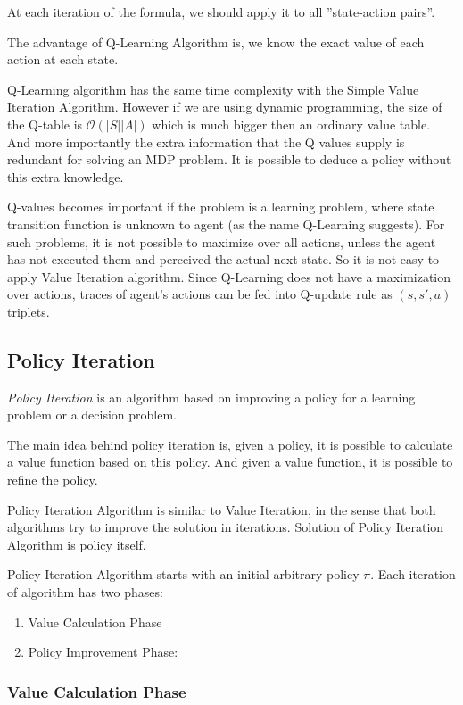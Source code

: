 At each iteration of the formula, we should apply it to all ''state-action pairs''.

The advantage of Q-Learning Algorithm is, we know the exact value of each action at each state.

Q-Learning algorithm has the same time complexity with the Simple Value Iteration Algorithm. However if we are using dynamic programming, the size of the Q-table is $\mathcal{O} (|S||A|)$ which is much bigger then an ordinary value table. And more importantly the extra information that the Q values supply is redundant for solving an MDP problem. It is possible to deduce a policy without this extra knowledge.

Q-values becomes important if the problem is a learning problem, where state transition function is unknown to agent (as the name Q-Learning suggests). For such problems, it is not possible to maximize over all actions, unless the agent has not executed them and perceived the actual next state. So it is not easy to apply Value Iteration algorithm. Since Q-Learning does not have a maximization over actions, traces of agent's actions can be fed into Q-update rule as $(s,s',a)$ triplets.

\subsection{Policy Iteration}

\emph{Policy Iteration} is an algorithm based on improving a policy for a learning problem or a decision problem.

The main idea behind policy iteration is, given a policy, it is possible to calculate a value function based on this policy. And given a value function, it is possible to refine the policy.

Policy Iteration Algorithm is similar to Value Iteration, in the sense that both algorithms try to improve the solution in iterations. Solution of Policy Iteration Algorithm is policy itself.

Policy Iteration Algorithm starts with an initial arbitrary policy $\pi$. Each iteration of algorithm has two phases:

\begin{enumerate}
\item Value Calculation Phase
\item Policy Improvement Phase:
\end{enumerate}

\subsubsection{Value Calculation Phase}

